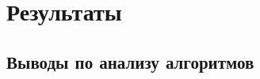 \chapter{Результаты} \label{ch:ch5}

\section{Выводы по анализу алгоритмов} \label{ch:ch5/sect1}

\clearpage